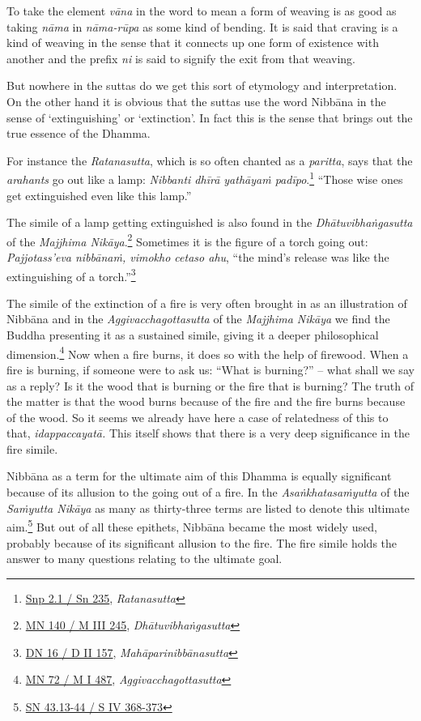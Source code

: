 To take the element \emph{vāna} in the word to mean a form of weaving is as good as taking \emph{nāma} in \emph{nāma-rūpa} as some kind of bending. It is said that craving is a kind of weaving in the sense that it connects up one form of existence with another and the prefix \emph{ni} is said to signify the exit from that weaving.

But nowhere in the suttas do we get this sort of etymology and interpretation. On the other hand it is obvious that the suttas use the word Nibbāna in the sense of `extinguishing' or `extinction'. In fact this is the sense that brings out the true essence of the Dhamma.

For instance the \emph{Ratanasutta}, which is so often chanted as a \emph{paritta}, says that the \emph{arahants} go out like a lamp: \emph{Nibbanti dhīrā yathāyaṁ padīpo}.\footnote{\href{https://suttacentral.net/snp2.1/pli/ms}{Snp 2.1 / Sn 235}, \emph{Ratanasutta}} ``Those wise ones get extinguished even like this lamp.''

The simile of a lamp getting extinguished is also found in the \emph{Dhātuvibhaṅgasutta} of the \emph{Majjhima Nikāya}.\footnote{\href{https://suttacentral.net/mn140/pli/ms}{MN 140 / M III 245}, \emph{Dhātuvibhaṅgasutta}} Sometimes it is the figure of a torch going out: \emph{Pajjotass'eva nibbānaṁ, vimokho cetaso ahu}, ``the mind's release was like the extinguishing of a torch.''\footnote{\href{https://suttacentral.net/dn16/pli/ms}{DN 16 / D II 157}, \emph{Mahāparinibbānasutta}}

The simile of the extinction of a fire is very often brought in as an illustration of Nibbāna and in the \emph{Aggivacchagottasutta} of the \emph{Majjhima Nikāya} we find the Buddha presenting it as a sustained simile, giving it a deeper philosophical dimension.\footnote{\href{https://suttacentral.net/mn72/pli/ms}{MN 72 / M I 487}, \emph{Aggivacchagottasutta}} Now when a fire burns, it does so with the help of firewood. When a fire is burning, if someone were to ask us: ``What is burning?'' -- what shall we say as a reply? Is it the wood that is burning or the fire that is burning? The truth of the matter is that the wood burns because of the fire and the fire burns because of the wood. So it seems we already have here a case of relatedness of this to that, \emph{idappaccayatā.} This itself shows that there is a very deep significance in the fire simile.

Nibbāna as a term for the ultimate aim of this Dhamma is equally significant because of its allusion to the going out of a fire. In the \emph{Asaṅkhatasaṁyutta} of the \emph{Saṁyutta Nikāya} as many as thirty-three terms are listed to denote this ultimate aim.\footnote{\href{https://suttacentral.net/sn43.13/pli/ms}{SN 43.13-44 / S IV 368-373}} But out of all these epithets, Nibbāna became the most widely used, probably because of its significant allusion to the fire. The fire simile holds the answer to many questions relating to the ultimate goal.

